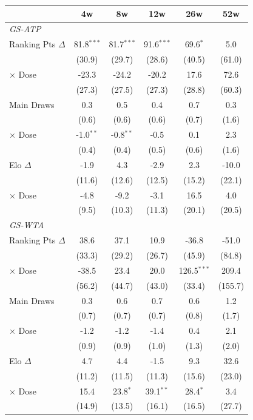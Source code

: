 \begin{tabular}{l*{5}{c}}
\toprule
 & 4w & 8w & 12w & 26w & 52w \\
\midrule
\multicolumn{6}{l}{\textit{GS-ATP}} \\
  Ranking Pts $\Delta$ & 81.8$^{***}$ & 81.7$^{***}$ & 91.6$^{***}$ & 69.6$^{*}$ & 5.0 \\
  & (30.9) & (29.7) & (28.6) & (40.5) & (61.0) \\
  $\times$ Dose & -23.3 & -24.2 & -20.2 & 17.6 & 72.6 \\
  & (27.3) & (27.5) & (27.3) & (28.8) & (60.3) \\[0.3em]
  Main Draws & 0.3 & 0.5 & 0.4 & 0.7 & 0.3 \\
  & (0.6) & (0.6) & (0.6) & (0.7) & (1.6) \\
  $\times$ Dose & -1.0$^{**}$ & -0.8$^{**}$ & -0.5 & 0.1 & 2.3 \\
  & (0.4) & (0.4) & (0.5) & (0.6) & (1.6) \\[0.3em]
  Elo $\Delta$ & -1.9 & 4.3 & -2.9 & 2.3 & -10.0 \\
  & (11.6) & (12.6) & (12.5) & (15.2) & (22.1) \\
  $\times$ Dose & -4.8 & -9.2 & -3.1 & 16.5 & 4.0 \\
  & (9.5) & (10.3) & (11.3) & (20.1) & (20.5) \\[0.3em]
\midrule
\multicolumn{6}{l}{\textit{GS-WTA}} \\
  Ranking Pts $\Delta$ & 38.6 & 37.1 & 10.9 & -36.8 & -51.0 \\
  & (33.3) & (29.2) & (26.7) & (45.9) & (84.8) \\
  $\times$ Dose & -38.5 & 23.4 & 20.0 & 126.5$^{***}$ & 209.4 \\
  & (56.2) & (44.7) & (43.0) & (33.4) & (155.7) \\[0.3em]
  Main Draws & 0.3 & 0.6 & 0.7 & 0.6 & 1.2 \\
  & (0.7) & (0.7) & (0.7) & (0.8) & (1.7) \\
  $\times$ Dose & -1.2 & -1.2 & -1.4 & 0.4 & 2.1 \\
  & (0.9) & (0.9) & (1.0) & (1.3) & (2.0) \\[0.3em]
  Elo $\Delta$ & 4.7 & 4.4 & -1.5 & 9.3 & 32.6 \\
  & (11.2) & (11.5) & (11.3) & (15.6) & (23.0) \\
  $\times$ Dose & 15.4 & 23.8$^{*}$ & 39.1$^{**}$ & 28.4$^{*}$ & 3.4 \\
  & (14.9) & (13.5) & (16.1) & (16.5) & (27.7) \\[0.3em]
\midrule
\bottomrule
\end{tabular}
